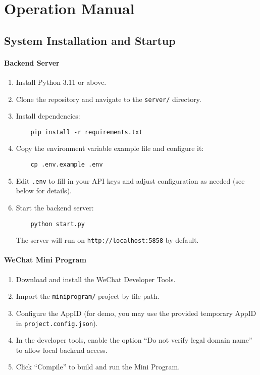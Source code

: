 \section{Operation Manual}
\label{sec:manual}

\subsection{System Installation and Startup}

\paragraph{Backend Server}
\begin{enumerate}
    \item Install Python 3.11 or above.
    \item Clone the repository and navigate to the \texttt{server/} directory.
    \item Install dependencies:
    \begin{verbatim}
    pip install -r requirements.txt
    \end{verbatim}
    \item Copy the environment variable example file and configure it:
    \begin{verbatim}
    cp .env.example .env
    \end{verbatim}
    \item Edit \texttt{.env} to fill in your API keys and adjust configuration as needed (see below for details).
    \item Start the backend server:
    \begin{verbatim}
    python start.py
    \end{verbatim}
    The server will run on \texttt{http://localhost:5858} by default.
\end{enumerate}

\paragraph{WeChat Mini Program}
\begin{enumerate}
    \item Download and install the WeChat Developer Tools.
    \item Import the \texttt{miniprogram/} project by file path.
    \item Configure the AppID (for demo, you may use the provided temporary AppID in \texttt{project.config.json}).
    \item In the developer tools, enable the option ``Do not verify legal domain name'' to allow local backend access.
    \item Click ``Compile'' to build and run the Mini Program.
\end{enumerate}


